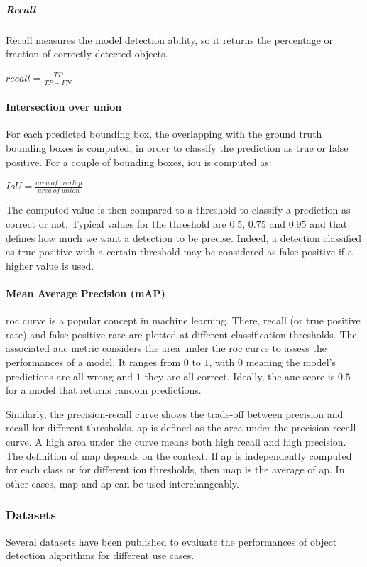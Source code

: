 \documentclass[%
    corpo=12pt,
    twoside,
    stile=classica,   
    tipotesi=magistrale,
    evenboxes,
    english,
	numerazioneromana,
]{toptesi}
\begin{document}
\subparagraph{Recall}
Recall measures the model detection ability, so it returns the percentage or fraction of correctly detected objects.
\begin{center}
	$recall = \frac{TP}{TP+FN}$
\end{center}

\paragraph{Intersection over union}
For each predicted bounding box, the overlapping with the ground truth bounding boxes is computed, in order to classify the prediction as true or false positive. For a couple of bounding boxes, \gls{iou} is computed as:
\begin{center}
	$IoU = \frac{area\ of\ overlap}{area\ of\ union}$
\end{center}
The computed value is then compared to a threshold to classify a prediction as correct or not. Typical values for the threshold are $0.5$, $0.75$ and $0.95$ and that defines how much we want a detection to be precise. Indeed, a detection classified as true positive with a certain threshold may be considered as false positive if a higher value is used.

\paragraph{Mean Average Precision (mAP)}
\gls{roc} curve is a popular concept in machine learning. There, recall (or true positive rate) and false positive rate are plotted at different classification thresholds. The associated \gls{auc} metric considers the area under the \gls{roc} curve to assess the performances of a model.\cite{roc} It ranges from $ 0 $ to $ 1 $, with $ 0 $ meaning the model's predictions are all wrong and $ 1 $ they are all correct. Ideally, the \gls{auc} score is $ 0.5 $ for a model that returns random predictions.

Similarly, the precision-recall curve shows the trade-off between precision and recall for different thresholds\cite{precrecall}. \gls{ap} is defined as the area under the precision-recall curve. A high area under the curve means both high recall and high precision. The definition of \gls{map} depends on the context. If \gls{ap} is independently computed for each class or for different \gls{iou} thresholds, then \gls{map} is the average of \gls{ap}. In other cases, \gls{map} and \gls{ap} can be used interchangeably.


\subsubsection{Datasets}\label{sec:datasets}
Several datasets have been published to evaluate the performances of object detection algorithms for different use cases.
\end{document}
